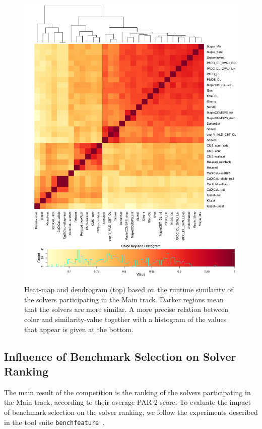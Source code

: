 \documentclass{elsarticle}
\begin{document}
\begin{figure}[tp]
    \centering
    \includegraphics[width=\textwidth]{similarity/cross.pdf}
    \caption{Heat-map and dendrogram (top) based on the runtime similarity of the solvers participating in the Main track.
      Darker regions mean that the solvers are more similar.
      A more precise relation between color and similarity-value together with a histogram of the values that appear is given at the bottom.
    }
    \label{fig-similarity-main}
\end{figure}

\subsection{Influence of Benchmark Selection on Solver Ranking}
The main result of the competition is the ranking of the solvers participating
in the Main track, according to their average PAR-2 score. To evaluate the impact
of benchmark selection on the solver ranking, we follow the experiments
described in the tool suite
\texttt{benchfeature}~\cite{benchfeature}.
\end{document}

